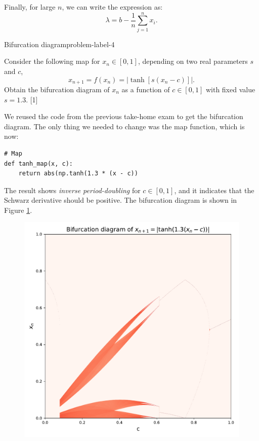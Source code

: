 \begin{enumerate}[(a)]
    Finally, for large $n$, we can write the expression as:
    \[
    \boxed{
        \lambda = b - \frac{1}{n}\sum_{j=1}^{n}x_i.
    }
    \]

\end{enumerate}

\begin{problem}{Bifurcation diagram}{problem-label-4}

Consider the following map for $x_n \in [0,1]$, depending on two real parameters $s$ and $c$,
\[
    x_{n+1} = f(x_n) = |\tanh[s(x_n-c)]|.
\]
Obtain the bifurcation diagram of $x_n$ as a function of $c \in [0,1]$ with fixed value $s=1.3$. [1]

\end{problem}

We reused the code from the previous take-home exam to get the bifurcation diagram. The only
thing we needed to change was the map function, which is now:

\begin{lstlisting}[style=pythonstyle]
# Map 
def tanh_map(x, c):
    return abs(np.tanh(1.3 * (x - c))
\end{lstlisting}

The result shows \textit{inverse period-doubling} for $c \in [0, 1]$, and it indicates
that the Schwarz derivative should be positive. 
The bifurcation diagram is shown in Figure \ref{fig:1a}.
\begin{figure}[!ht]
    \centering
    \includegraphics[scale=0.65]{images/tanh.pdf}
    \label{fig:1a}
\end{figure}

